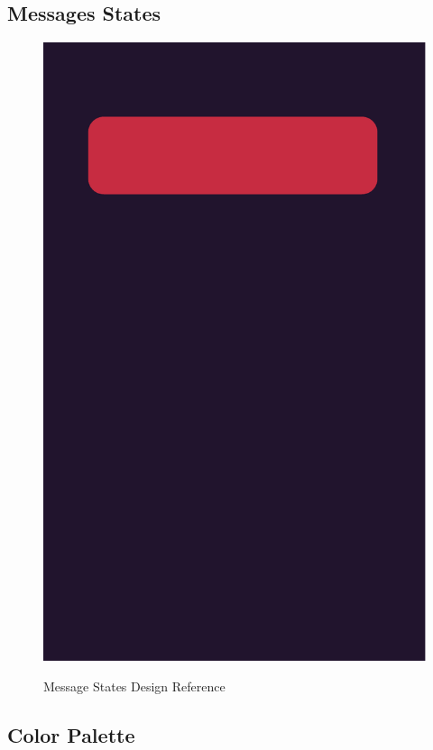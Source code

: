 \subsection{Messages States}\label{subsec:messages-states}
\begin{figure}[H]
    \centering
    \caption{Message States Design Reference}
    \includegraphics[height=0.9\textheight]{./graphics/message-states}\label{fig:figure3}
\end{figure}

\subsection{Color Palette}\label{subsec:color-palette}

